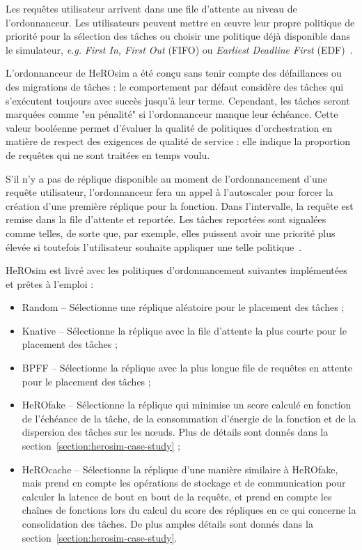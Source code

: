Les requêtes utilisateur arrivent dans une file d'attente au niveau de l'ordonnanceur. Les utilisateurs peuvent mettre en œuvre leur propre politique de priorité pour la sélection des tâches ou choisir une politique déjà disponible dans le simulateur, \textit{e.g.} \textit{First In, First Out} (\gls{FIFO}) ou \textit{Earliest Deadline First} (\gls{EDF})~\cite{herofake}.

L'ordonnanceur de HeROsim a été conçu sans tenir compte des défaillances ou des migrations de tâches : le comportement par défaut considère des tâches qui s'exécutent toujours avec succès jusqu'à leur terme. Cependant, les tâches seront marquées comme "en pénalité" si l'ordonnanceur manque leur échéance. Cette valeur booléenne permet d'évaluer la qualité de politiques d'orchestration en matière de respect des exigences de qualité de service : elle indique la proportion de requêtes qui ne sont traitées en temps voulu.

S'il n'y a pas de réplique disponible au moment de l'ordonnancement d'une requête utilisateur, l'ordonnanceur fera un appel à l'autoscaler pour forcer la création d'une première réplique pour la fonction. Dans l'intervalle, la requête est remise dans la file d'attente et reportée. Les tâches reportées sont signalées comme telles, de sorte que, par exemple, elles puissent avoir une priorité plus élevée si toutefois l'utilisateur souhaite appliquer une telle politique~\cite{herocache}.

HeROsim est livré avec les politiques d'ordonnancement suivantes implémentées et prêtes à l'emploi :

\begin{itemize}
    \item Random -- Sélectionne une réplique aléatoire pour le placement des tâches ;
    \item Knative -- Sélectionne la réplique avec la file d'attente la plus courte pour le placement des tâches ;
    \item \gls{BPFF} -- Sélectionne la réplique avec la plus longue file de requêtes en attente pour le placement des tâches ;
    \item HeROfake -- Sélectionne la réplique qui minimise un score calculé en fonction de l'échéance de la tâche, de la consommation d'énergie de la fonction et de la dispersion des tâches sur les nœuds. Plus de détails sont donnés dans la section~\ref{section:herosim-case-study} ;
    \item HeROcache -- Sélectionne la réplique d'une manière similaire à HeROfake, mais prend en compte les opérations de stockage et de communication pour calculer la latence de bout en bout de la requête, et prend en compte les chaînes de fonctions lors du calcul du score des répliques en ce qui concerne la consolidation des tâches. De plus amples détails sont donnés dans la section~\ref{section:herosim-case-study}.
\end{itemize}

